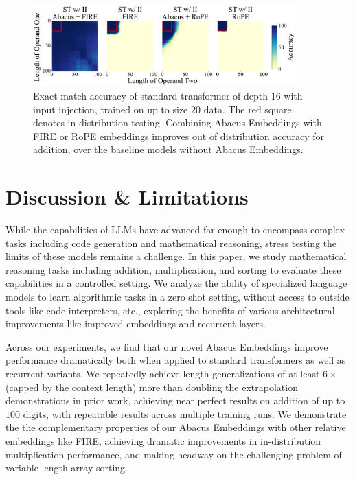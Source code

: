 \documentclass{article}
\begin{document}
\begin{figure}[ht!]
    \centering
    \includegraphics[width=0.9\textwidth]{Figures/grids/grids_plot_nine.pdf}
    \caption{
    Exact match accuracy of standard transformer of depth 16 with input injection, trained on up to size \(20\) data.
    The red square denotes in distribution testing.
    Combining Abacus Embeddings with FIRE or RoPE embeddings improves out of distribution accuracy for addition, over the baseline models without Abacus Embeddings.
    }
    \label{fig:combined_abacus}
\end{figure}

 
\section{Discussion \& Limitations}
\label{sec:discussion}
While the capabilities of LLMs have advanced far enough to encompass complex tasks including code generation and mathematical reasoning, stress testing the limits of these models remains a challenge.
In this paper, we study mathematical reasoning tasks including addition, multiplication, and sorting to evaluate these capabilities in a controlled setting.
We analyze the ability of specialized language models to learn algorithmic tasks in a zero shot setting, without access to outside tools like code interpreters, etc., exploring the benefits of various architectural improvements like improved embeddings and recurrent layers.

Across our experiments, we find that our novel Abacus Embeddings improve performance dramatically both when applied to standard transformers as well as recurrent variants. 
We repeatedly achieve length generalizations of at least $6\times$ (capped by the context length) more than doubling the extrapolation demonstrations in prior work, achieving near perfect results on addition of up to $100$ digits, with repeatable results across multiple training runs.
We demonstrate the the complementary properties of our Abacus Embeddings with other relative embeddings like FIRE, achieving dramatic improvements in in-distribution multiplication performance, and making headway on the challenging problem of variable length array sorting.
\end{document}

